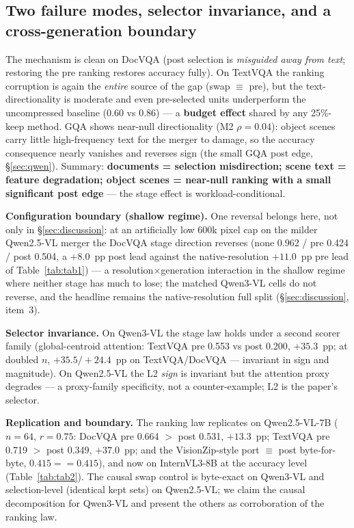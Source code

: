 \documentclass[sigconf,review,anonymous]{acmart}
\begin{document}
\subsection{Two failure modes, selector invariance, and a cross-generation boundary}\label{sec:modes}

The mechanism is clean on DocVQA (post selection is \emph{misguided away from
text}; restoring the pre ranking restores accuracy fully). On TextVQA the
ranking corruption is again the \emph{entire} source of the gap (swap $\equiv$
pre), but the text-directionality is moderate and even pre-selected units
underperform the uncompressed baseline (0.60 vs 0.86) --- a \textbf{budget
effect} shared by any 25\%-keep method. GQA shows near-null directionality (M2
$\rho = 0.04$): object scenes carry little high-frequency text for the merger to
damage, so the accuracy consequence nearly vanishes and reverses sign (the small
GQA post edge, \S\ref{sec:qwen}). Summary: \textbf{documents = selection
misdirection; scene text = feature degradation; object scenes = near-null
ranking with a small significant post edge} --- the stage effect is
workload-conditional.

\textbf{Configuration boundary (shallow regime).} One reversal belongs here, not
only in \S\ref{sec:discussion}: at an artificially low 600k pixel cap on the
milder Qwen2.5-VL merger the DocVQA stage direction reverses (none 0.962 / pre
0.424 / post 0.504, a $+8.0$~pp post lead against the native-resolution
$+11.0$~pp pre lead of Table~\ref{tab:tab1}) --- a resolution$\times$generation
interaction in the shallow regime where neither stage has much to lose; the
matched Qwen3-VL cells do not reverse, and the headline remains the
native-resolution full split (\S\ref{sec:discussion}, item~3).

\textbf{Selector invariance.} On Qwen3-VL the stage law holds under a second
scorer family (global-centroid attention: TextVQA pre 0.553 vs post 0.200,
$+35.3$~pp; at doubled $n$, $+35.5 / +24.4$~pp on TextVQA/DocVQA --- invariant
in sign and magnitude). On Qwen2.5-VL the L2 \emph{sign} is invariant but the
attention proxy degrades --- a proxy-family specificity, not a counter-example;
L2 is the paper's selector.

\textbf{Replication and boundary.} The ranking law replicates on
Qwen2.5-VL-7B ($n = 64$, $r = 0.75$: DocVQA pre 0.664 $>$ post 0.531,
$+13.3$~pp; TextVQA pre 0.719 $>$ post 0.349, $+37.0$~pp; and the VisionZip-style
port $\equiv$ post byte-for-byte, $0.415 == 0.415$), and now on InternVL3-8B at
the accuracy level (Table~\ref{tab:tab2}). The causal swap control is byte-exact
on Qwen3-VL and selection-level (identical kept sets) on Qwen2.5-VL; we claim
the causal decomposition for Qwen3-VL and present the others as corroboration of
the ranking law.
\end{document}
